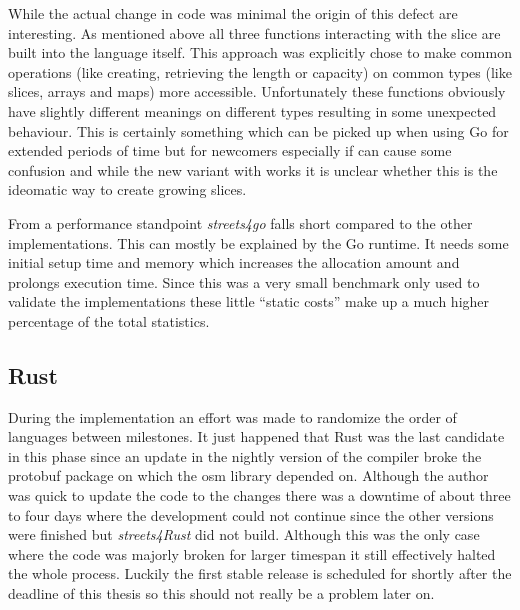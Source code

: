 While the actual change in code was minimal the origin of this defect are interesting. As mentioned above all three functions interacting with the slice are built into the language itself. This approach was explicitly chose to make common operations (like creating, retrieving the length or capacity) on common types (like slices, arrays and maps) more accessible. Unfortunately these functions obviously have slightly different meanings on different types resulting in some unexpected behaviour. This is certainly something which can be picked up when using Go for extended periods of time but for newcomers especially if can cause some confusion and while the new variant with  works it is unclear whether this is the ideomatic way to create growing slices.

From a performance standpoint \textit{streets4go} falls short compared to the other implementations. This can mostly be explained by the Go runtime. It needs some initial setup time and memory which increases the allocation amount and prolongs execution time. Since this was a very small benchmark only used to validate the implementations these little ``static costs'' make up a much higher percentage of the total statistics.

\subsection{Rust}
\label{subsec:Implementation::Verification::Rust}

During the implementation an effort was made to randomize the order of languages between milestones. It just happened that Rust was the last candidate in this phase since an update in the nightly version of the compiler broke the \gls{protobuf} package on which the \gls{osm} library depended on. Although the author was quick to update the code to the changes there was a downtime of about three to four days where the development could not continue since the other versions were finished but \textit{streets4Rust} did not build. Although this was the only case where the code was majorly broken for larger timespan it still effectively halted the whole process. Luckily the first stable release is scheduled for shortly after the deadline of this thesis so this should not really be a problem later on.

